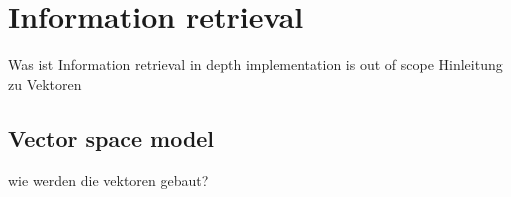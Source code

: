 


\section{Information retrieval}
Was ist Information retrieval
in depth implementation is out of scope
Hinleitung zu Vektoren


\subsection{Vector space model}
wie werden die vektoren gebaut?












